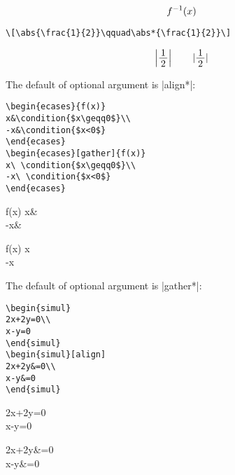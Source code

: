 \documentclass[%
fleqn,%
paper=a4paper,%
fontsize=10pt,%
open_bracket_pos=zenkakunibu_nibu,%
hanging_punctuation,%
]%
{jlreq}
\makeatletter
\DeclareRobustCommand{\linesmash}{\@ifstar{\vspace{-\baselineskip}}{\vspace{-0.25\baselineskip}}}
\makeatother
\begin{document}
\begin{macroexample}
\linesmash\linesmash
\[f^{-1}(x)\]
\end{macroexample}

\begin{lstlisting}
\[\abs{\frac{1}{2}}\qquad\abs*{\frac{1}{2}}\]
\end{lstlisting}

\begin{macroexample}
\linesmash
\[\abs{\frac{1}{2}}\qquad\abs*{\frac{1}{2}}\]
\end{macroexample}

\newpage
\indent\hspace*{0.14\textwidth}The default of optional argument is |align*|:
\begin{lstlisting}
\begin{ecases}{f(x)}
x&\condition{$x\geqq0$}\\
-x&\condition{$x<0$}
\end{ecases}
\begin{ecases}[gather]{f(x)}
x\ \condition{$x\geqq0$}\\
-x\ \condition{$x<0$}
\end{ecases}
\end{lstlisting}

\begin{macroexample}
\begin{ecases}{f(x)}
x&\\
-x&
\end{ecases}\linesmash
\begin{ecases}[gather]{f(x)}
x\ \\
-x\ 
\end{ecases}
\end{macroexample}

\indent\hspace*{0.14\textwidth}The default of optional argument is |gather*|:
\begin{lstlisting}
\begin{simul}
2x+2y=0\\
x-y=0
\end{simul}
\begin{simul}[align]
2x+2y&=0\\
x-y&=0
\end{simul}
\end{lstlisting}

\begin{macroexample}
\begin{simul}
2x+2y=0\\
x-y=0
\end{simul}\linesmash
\begin{simul}[align]
2x+2y&=0\\
x-y&=0
\end{simul}
\end{macroexample}
\end{document}
